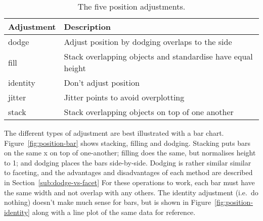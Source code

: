 \begin{table}
  \begin{center}
  \begin{tabular}{ll}
    \toprule
    Adjustment & Description  \\
    \midrule
    dodge     & Adjust position by dodging overlaps to the side \\
    fill      & Stack overlapping objects and standardise have equal height\\
    identity  & Don't adjust position \\
    jitter    & Jitter points to avoid overplotting \\
    stack     & Stack overlapping objects on top of one another \\
    \bottomrule
  \end{tabular}
  \end{center}
  \caption{The five position adjustments.}
  \label{fig:position}
\end{table}

The different types of adjustment are best illustrated with a bar chart.  Figure~\ref{fig:position-bar} shows stacking, filling and dodging.  Stacking puts bars on the same x on top of one-another; filling does the same, but normalises height to 1; and dodging places the bars side-by-side.  Dodging is rather similar similar to faceting, and the advantages and disadvantages of each method are described in Section~\ref{sub:dodge-vs-facet} For these operations to work, each bar must have the same width and not overlap with any others.  The identity adjustment (i.e.\ do nothing) doesn't make much sense for bars, but is shown in Figure~\ref{fig:position-identity} along with a line plot of the same data for reference.

% 


% 


